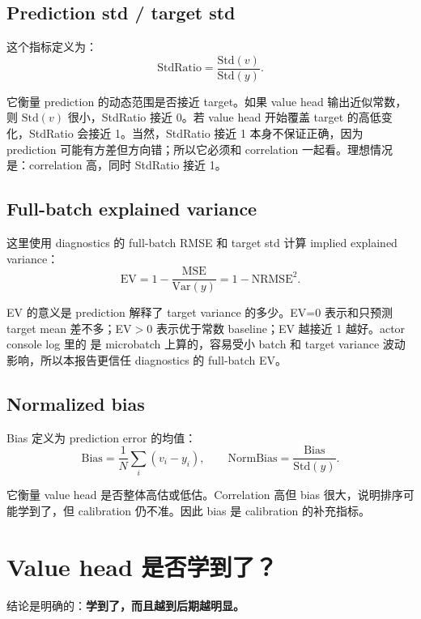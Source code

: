 \documentclass[10pt]{ctexart}
\begin{document}
\subsection{Prediction std / target std}
这个指标定义为：
\begin{equation}
  \mathrm{StdRatio} = \frac{\mathrm{Std}(v)}{\mathrm{Std}(y)}.
\end{equation}

它衡量 prediction 的动态范围是否接近 target。如果 value head 输出近似常数，则 $\mathrm{Std}(v)$ 很小，StdRatio 接近 0。若 value head 开始覆盖 target 的高低变化，StdRatio 会接近 1。当然，StdRatio 接近 1 本身不保证正确，因为 prediction 可能有方差但方向错；所以它必须和 correlation 一起看。理想情况是：correlation 高，同时 StdRatio 接近 1。

\subsection{Full-batch explained variance}
这里使用 diagnostics 的 full-batch RMSE 和 target std 计算 implied explained variance：
\begin{equation}
  \mathrm{EV} = 1 - \frac{\mathrm{MSE}}{\mathrm{Var}(y)} = 1 - \mathrm{NRMSE}^2.
\end{equation}

EV 的意义是 prediction 解释了 target variance 的多少。EV=0 表示和只预测 target mean 差不多；EV$>0$ 表示优于常数 baseline；EV 越接近 1 越好。actor console log 里的  是 microbatch 上算的，容易受小 batch 和 target variance 波动影响，所以本报告更信任 diagnostics 的 full-batch EV。

\subsection{Normalized bias}
Bias 定义为 prediction error 的均值：
\begin{equation}
  \mathrm{Bias} = \frac{1}{N}\sum_i (v_i-y_i), \qquad
  \mathrm{NormBias}=\frac{\mathrm{Bias}}{\mathrm{Std}(y)}.
\end{equation}

它衡量 value head 是否整体高估或低估。Correlation 高但 bias 很大，说明排序可能学到了，但 calibration 仍不准。因此 bias 是 calibration 的补充指标。

\section{Value head 是否学到了？}
结论是明确的：\textbf{学到了，而且越到后期越明显。}
\end{document}
